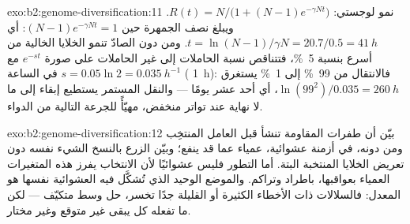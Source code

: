\begin{solution}{exo:b2:genome-diversification:11}
نمو لوجستي: $R(t) = N/\bigl(1 + (N - 1)e^{-\gamma Nt}\bigr)$.
ويبلغ نصف الجمهرة حين $(N - 1)e^{-\gamma Nt} = 1$: أي $t = \ln(N -
1)/\gamma N = 20.7/0.5 = \qty{41}{h}$. ومن دون الصادّ تنمو الخلايا
الخالية من  أسرع بنسبة \qty{5}{\%}، فتتناقص نسبة الحاملات
إلى غير الحاملات على صورة $e^{-st}$ مع $s = 0.05\ln 2 =
\qty{0.035}{h^{-1}}$ في الساعة ( \qty{1}{h}): فالانتقال من
\qty{99}{\%} إلى \qty{1}{\%} يستغرق $\ln(99^2)/0.035 = \qty{260}{h}$،
أي أحد عشر يومًا --- والنقل المستمر يستطيع إبقاء  إلى ما لا
نهاية عند تواتر منخفض، مهيّأً للجرعة التالية من الدواء.
\end{solution}

\begin{solution}{exo:b2:genome-diversification:12}
بيّن  أن طفرات المقاومة تنشأ قبل العامل المنتخِب
ومن دونه، في أزمنة عشوائية،  عمياء عما قد ينفع؛ وبيّن الزرع
بالنسخ الشيء نفسه دون تعريض الخلايا المنتخبة البتة. أما التطور فليس
عشوائيًا لأن الانتخاب يفرز هذه المتغيرات العمياء بعواقبها، باطراد
وتراكم. والموضع الوحيد الذي تُشكَّل فيه العشوائية نفسها هو المعدل:
فالسلالات ذات الأخطاء الكثيرة أو القليلة جدًا تخسر،  حل
وسط متكيّف --- لكن ما تفعله كل  يبقى غير متوقع وغير مختار.
\end{solution}

